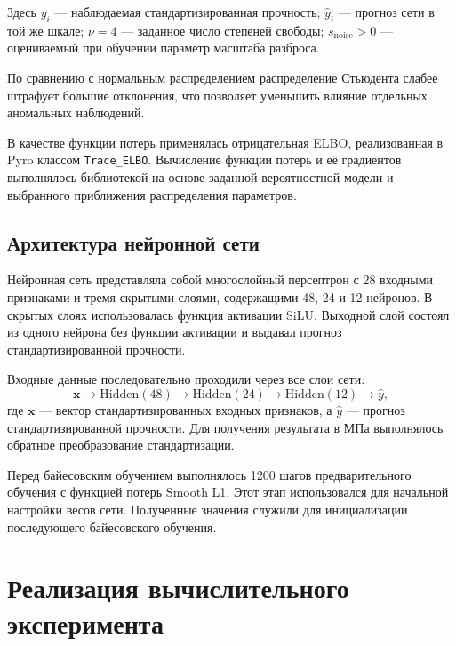 Здесь $y_i$ --- наблюдаемая стандартизированная прочность;
$\hat{y}_i$ --- прогноз сети в той же шкале;
$\nu = 4$ --- заданное число степеней свободы;
$s_{\mathrm{noise}} > 0$ --- оцениваемый при обучении
параметр масштаба разброса.

По сравнению с нормальным распределением
распределение Стьюдента слабее штрафует большие
отклонения, что позволяет уменьшить влияние
отдельных аномальных наблюдений.


В качестве функции потерь применялась отрицательная
ELBO, реализованная в Pyro классом
\texttt{Trace\_ELBO}.
Вычисление функции потерь и её градиентов 
выполнялось библиотекой на основе заданной 
вероятностной модели и выбранного приближения 
распределения параметров.

\subsection{Архитектура нейронной сети}

Нейронная сеть представляла собой многослойный
персептрон с 28 входными признаками и тремя
скрытыми слоями, содержащими 48, 24 и 12 нейронов.
В скрытых слоях использовалась функция активации
SiLU. Выходной слой состоял из одного нейрона
без функции активации и выдавал прогноз
стандартизированной прочности.

Входные данные последовательно проходили
через все слои сети:
\begin{equation}
    \mathbf{x}
    \longrightarrow \mathrm{Hidden}(48)
    \longrightarrow \mathrm{Hidden}(24)
    \longrightarrow \mathrm{Hidden}(12)
    \longrightarrow \hat{y},
\end{equation}
где $\mathbf{x}$ --- вектор стандартизированных
входных признаков, а $\hat{y}$ --- прогноз
стандартизированной прочности.
Для получения результата в МПа выполнялось
обратное преобразование стандартизации.

Перед байесовским обучением выполнялось
1200 шагов предварительного обучения
с функцией потерь Smooth L1.
Этот этап использовался для начальной настройки
весов сети. Полученные значения служили
для инициализации последующего
байесовского обучения.

\section{Реализация вычислительного эксперимента}

